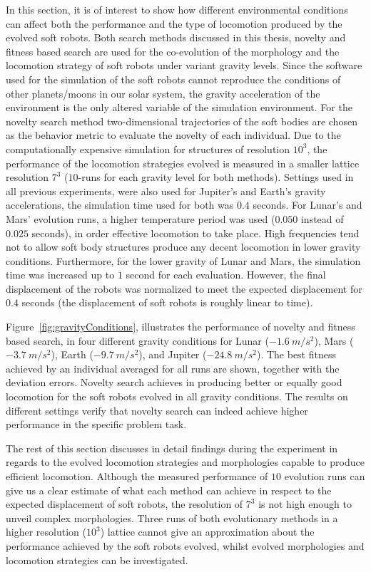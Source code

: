 In this section, it is of interest to show how different environmental conditions can affect both the performance and the type of locomotion produced by the evolved soft robots. Both search methods discussed in this thesis, novelty and fitness based search are used for the co-evolution of the morphology and the locomotion strategy of soft robots under variant gravity levels. Since the software used for the simulation of the soft robots cannot reproduce the conditions of other planets/moons in our solar system, the gravity acceleration of the environment is the only altered variable of the simulation environment. For the novelty search method two-dimensional trajectories of the soft bodies are chosen as the behavior metric to evaluate the novelty of each individual. Due to the computationally expensive simulation for structures of resolution $10^3$, the performance of the locomotion strategies evolved is measured in a smaller lattice resolution $7^3$ ($10$-runs for each gravity level for both methods). Settings used in all previous experiments, were also used for Jupiter's and Earth's gravity accelerations, the simulation time used for both was $0.4$ seconds. For Lunar's and Mars' evolution runs, a higher temperature period was used ($0.050$ instead of $0.025$ seconds), in order effective locomotion to take place. High frequencies tend not to allow soft body structures produce any decent locomotion in lower gravity conditions. Furthermore, for the lower gravity of Lunar and Mars, the simulation time was increased up to $1$ second for each evaluation. However, the final displacement of the robots was normalized to meet the expected displacement for $0.4$ seconds (the displacement of soft robots is roughly linear to time).

Figure~\ref{fig:gravityConditions}, illustrates the performance of novelty and fitness based search, in four different gravity conditions for Lunar ($-1.6~m/s^2$), Mars ($-3.7~m/s^2$), Earth ($-9.7~m/s^2$), and Jupiter ($-24.8~m/s^2$). The best fitness achieved by an individual averaged for all runs are shown, together with the deviation errors. Novelty search achieves in producing better or equally good locomotion for the soft robots evolved in all gravity conditions. The results on different settings verify that novelty search can indeed achieve higher performance in the specific problem task. 

The rest of this section discusses in detail findings during the experiment in regards to the evolved locomotion strategies and morphologies capable to produce efficient locomotion. Although the measured performance of $10$ evolution runs can give us a clear estimate of what each method can achieve in respect to the expected displacement of soft robots, the resolution of $7^3$ is not high enough to unveil complex morphologies. Three runs of both evolutionary methods in a higher resolution ($10^3$) lattice cannot give an approximation about the performance achieved by the soft robots evolved, whilst evolved morphologies and locomotion strategies can be investigated.



